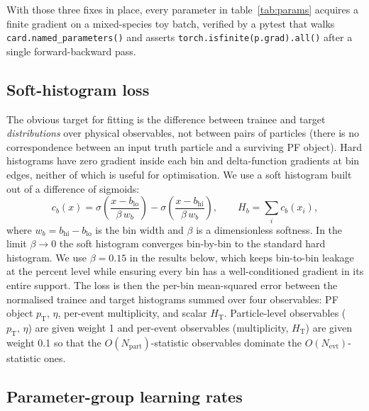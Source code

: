 \documentclass[a4paper,11pt]{article}
\begin{document}
With those three fixes in place, every parameter in
table~\ref{tab:params} acquires a finite gradient on a mixed-species
toy batch, verified by a pytest that walks \texttt{card.named\_parameters()}
and asserts \texttt{torch.isfinite(p.grad).all()} after a single
forward-backward pass.

\subsection{Soft-histogram loss}

The obvious target for fitting is the difference between
trainee and target \emph{distributions} over physical observables,
not between pairs of particles (there is no correspondence between
an input truth particle and a surviving PF object). Hard histograms
have zero gradient inside each bin and delta-function gradients at
bin edges, neither of which is useful for optimisation. We use a
soft histogram built out of a difference of sigmoids:
\begin{equation}
 c_b(x)
 = \sigma\!\left(\frac{x - b_\mathrm{lo}}{\beta\, w_b}\right)
 - \sigma\!\left(\frac{x - b_\mathrm{hi}}{\beta\, w_b}\right) ,
 \qquad
 H_b = \sum_{i} c_b(x_i) ,
\end{equation}
where $w_b = b_\mathrm{hi}-b_\mathrm{lo}$ is the bin width and
$\beta$ is a dimensionless softness. In the limit $\beta\to0$ the
soft histogram converges bin-by-bin to the standard hard histogram.
We use $\beta=0.15$ in the results below, which keeps bin-to-bin
leakage at the percent level while ensuring every bin has a
well-conditioned gradient in its entire support. The loss is then
the per-bin mean-squared error between the normalised trainee and
target histograms summed over four observables: PF object
$p_\mathrm{T}$, $\eta$, per-event multiplicity, and scalar
$H_\mathrm{T}$. Particle-level observables ($p_\mathrm{T},\,\eta$)
are given weight 1 and per-event observables (multiplicity, $H_\mathrm{T}$)
are given weight 0.1 so that the $O(N_\mathrm{part})$-statistic
observables dominate the $O(N_\mathrm{evt})$-statistic ones.

\subsection{Parameter-group learning rates}
\end{document}
